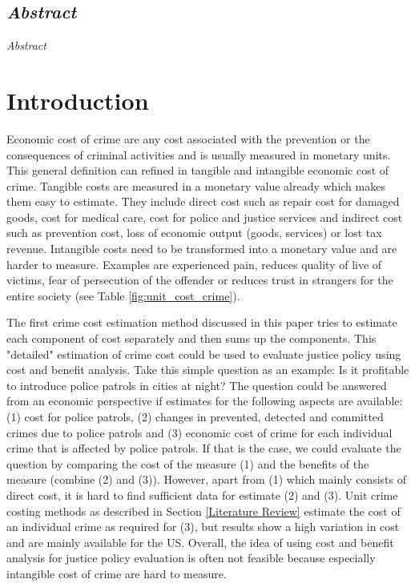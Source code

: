 \documentclass[a4paper,12pt]{article}
\begin{document}



\setcounter{page}{1}        %


\subsection*{\textit{Abstract}}

\textit{Abstract}


\section{Introduction}
\label{Introduction}
Economic cost of crime are any cost associated with the prevention or the consequences of criminal activities and is usually measured in monetary units.
This general definition can refined in tangible and intangible economic cost of crime.
Tangible costs are measured in a monetary value already which makes them easy to estimate. They include direct cost such as repair cost for damaged goods, cost for medical care, cost for police and justice services and indirect cost such as prevention cost, loss of economic output (goods, services) or lost tax revenue.
Intangible costs need to be transformed into a monetary value and are harder to measure. Examples are experienced pain, reduces quality of live of victims, fear of persecution of the offender or reduces trust in strangers for the entire society (see Table \ref{fig:unit_cost_crime}). \citep{kosten_nutzen_entorf} 

The first crime cost estimation method discussed in this paper tries to estimate each component of cost separately and then sums up the components.
This "detailed" estimation of crime cost could be used to evaluate justice policy using cost and benefit analysis. Take this simple question as an example: Is it profitable to introduce police patrols in cities at night? The question could be answered from an economic perspective if estimates for the following aspects are available: (1) cost for police patrols, (2) changes in prevented, detected and committed crimes due to police patrols and (3) economic cost of crime for each individual crime that is affected by police patrols. If that is the case, we could evaluate the question by comparing the cost of the measure (1) and the benefits of the measure (combine (2) and (3)).
However, apart from (1) which mainly consists of direct cost, it is hard to find sufficient data for estimate (2) and (3). Unit crime costing methods as described in Section \ref{Literature Review} estimate the cost of an individual crime as required for (3), but results show a high variation in cost and are mainly available for the US. 
Overall, the idea of using cost and benefit analysis for justice policy evaluation is often not feasible because especially intangible cost of crime are hard to measure.
\end{document}
